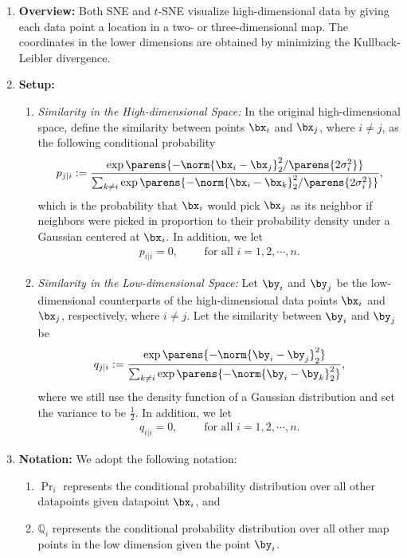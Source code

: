 \documentclass[12pt]{article}
\begin{document}
\begin{enumerate}[label=\textbf{\arabic*.}]

	\item \textbf{Overview:} Both SNE and $t$-SNE visualize high-dimensional data by giving each data point a location in a two- or three-dimensional map. The coordinates in the lower dimensions are obtained by minimizing the Kullback-Leibler divergence. 
	
	\item \textbf{Setup:} 
	\begin{enumerate}
		\item \textit{Similarity in the High-dimensional Space:} In the original high-dimensional space, define the similarity between points $\bx_i$ and $\bx_j$, where $i \neq j$, as the following conditional probability 
		\begin{align}\label{eq-sne-p-ji}
			p_{j \vert i} := \frac{\exp \parens{-\norm{\bx_i - \bx_j}_2^2 / \parens{2\sigma_i^2}}}{\sum_{k \neq i} \exp \parens{-\norm{\bx_i - \bx_k}_2^2 / \parens{2\sigma_i^2}}}, 
		\end{align}
		which is the probability that $\bx_i$ would pick $\bx_j$ as its neighbor if neighbors were picked in proportion to their probability density under a Gaussian centered at $\bx_i$. In addition, we let 
		\begin{align*}
			p_{i \vert i} = 0, \qquad \text{ for all } i = 1, 2, \cdots, n. 
		\end{align*}
		
		\item \textit{Similarity in the Low-dimensional Space:} Let $\by_i$ and $\by_j$ be the low-dimensional counterparts of the high-dimensional data points $\bx_i$ and $\bx_j$, respectively, where $i \neq j$. Let the similarity between $\by_i$ and $\by_j$ be 
		\begin{align*}
			q_{j \vert i} := \frac{\exp \parens{-\norm{\by_i - \by_j}_2^2}}{\sum_{k \neq i} \exp \parens{-\norm{\by_i - \by_k}_2^2}}, 
		\end{align*}
		where we still use the density function of a Gaussian distribution and set the variance to be $\frac{1}{2}$. In addition, we let 
		\begin{align*}
			q_{i\vert i} = 0, \qquad \text{ for all } i = 1, 2, \cdots, n. 
		\end{align*}
	\end{enumerate}
	
	\item \textbf{Notation:} We adopt the following notation: 
	\begin{enumerate}
		\item $\Pr_i$ represents the conditional probability distribution over all other datapoints given datapoint $\bx_i$, and 
		\item $\mathbb{Q}_i$ represents the conditional probability distribution over all other map points in the low dimension given the point $\by_i$. 
	\end{enumerate}
	

\end{enumerate}
\end{document}
